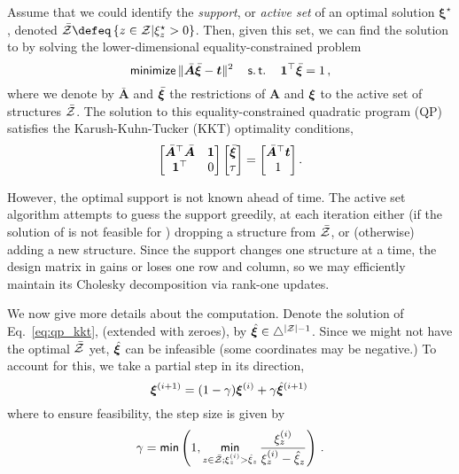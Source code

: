 \begin{lemma}
    Assume that we could identify the \emph{support}, or
    \emph{active set} of an optimal solution  $\bm{\xi}^\star$, denoted
    $\bar\ZZ \defeq \left\{z \in \ZZ |\xi^\star_z > 0\right\}$.
    Then, given this set, we can find the solution to 
    by solving the lower-dimensional equality-constrained problem
    \begin{equation}
        \operatorname*{\mathsf{minimize}}\| \bar{\bm{A}}\bar{\bm{\xi}} - \bm{t} \|^2
        \quad\operatorname*{\mathsf{s.t.}}\quad\bm{1}^\top\bar{\bm{\xi}} = 1\,,
    \end{equation}
    where we denote by $\bar{\bm{A}}$ and $\bar{\bm{\xi}}$ the restrictions of $\bm{A}$
    and $\bm{\xi}$ to the active set of structures $\bar{\mathcal{Z}}$.
    The solution to this equality-constrained quadratic program (QP) satisfies the Karush-Kuhn-Tucker (KKT) optimality
    conditions,
    \begin{equation}
        \label{eq:qp_kkt}
        \begin{bmatrix}
            {\bar{\bm{A}}}^\top \bar{\bm{A}} & \bm{1} \\
            \bm{1}^\top                      & 0      \\
        \end{bmatrix}
        \begin{bmatrix} \bar{\bm{\xi}} \\ \tau \end{bmatrix}
        =
        \begin{bmatrix} \bar{\bm{A}}^\top \bm{t} \\ 1 \end{bmatrix}.
    \end{equation}
\end{lemma}

However, the optimal support is not known ahead of time. The active set
algorithm attempts to guess the support greedily,
at each iteration either (if the solution of  is not feasible
for )
dropping a structure from $\bar{\mathcal{Z}}$, or (otherwise) adding a new structure.
Since the support changes one structure at a time, the design matrix in
 gains or loses one row and column, so
we may efficiently maintain its Cholesky decomposition via rank-one updates.

We now give more details about the computation.
Denote the solution of Eq.~\ref{eq:qp_kkt}, (extended with zeroes),
by $\hat{\bm{\xi}} \in \triangle^{|\mathcal{Z}|-1}$.
Since we might not have the optimal $\bar{\mathcal{Z}}$ yet, $\hat{\bm{\xi}}$ can be infeasible
(some coordinates may be negative.)
To account for this, we take a partial step in its direction,
%
\begin{equation}
    \bm{\xi}^{(i+1)} = (1-\gamma)\bm{\xi}^{(i)} + \gamma \hat{\bm{\xi}}^{(i+1)}\,
\end{equation}
%
where to ensure feasibility, the step size is given by
%
\begin{equation}\label{eq:step_size}
    \gamma = \operatorname*{\mathsf{min}} \left(1, \operatorname*{\mathsf{min}}_{z \in \bar{\mathcal{Z}}; \xi^{(i)}_z > \hat{\xi}_z}
    \frac{
        \xi^{(i)}_z
    }{
        \xi^{(i)}_z - \hat{\xi}_z}
    \right)\,.
\end{equation}


